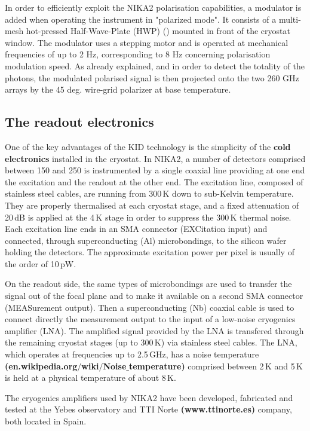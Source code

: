 \documentclass[]{aa} %
\begin{document}
In order to efficiently exploit the NIKA2 polarisation capabilities, a modulator is added when operating the instrument in "polarized mode". It consists of a multi-mesh hot-pressed Half-Wave-Plate (HWP) (\cite{Pisano2016}) mounted in front of the cryostat window. The modulator uses a stepping motor and is operated at mechanical frequencies of up to 2 Hz, corresponding to 8 Hz concerning polarisation modulation speed. As already explained, and in order to detect the totality of the photons, the modulated polarised signal is then projected onto the two 260 GHz arrays by the 45 deg. wire-grid polarizer at base temperature.  


 \subsection{The readout electronics}

One of the key advantages of the KID technology is the simplicity of the {\bf{cold electronics}} installed in the cryostat.
In NIKA2, a number of detectors comprised between 150 and 250 is instrumented by a single coaxial line providing at one end the excitation and the readout at the other end. The excitation line, composed of stainless steel cables, are running from 300\,K down to sub-Kelvin temperature. They are properly thermalised at each cryostat stage, and a fixed attenuation of 20\,dB is applied at the 4\,K stage in order to suppress the 300\,K thermal noise. Each excitation line ends in an SMA connector (EXCitation input) and connected, through superconducting (Al) microbondings, to the silicon wafer holding the detectors. The approximate excitation power per pixel is usually of the order of 10\,pW.

On the readout side, the same types of microbondings are used to transfer the signal out of the focal plane and to make it available on a second SMA connector (MEASurement output). Then a superconducting (Nb) coaxial cable is used to connect directly the measurement output to the input of a low-noise cryogenics amplifier (LNA). The amplified signal provided by the LNA is transfered through the remaining cryostat stages (up to 300\,K) via stainless steel cables. 
The LNA, which operates at frequencies up to 2.5\,GHz, has  a noise temperature \textbf{(en.wikipedia.org$/$wiki$/$Noise$\_$temperature)} comprised between 2\,K and 5\,K is held at a physical temperature of about 8\,K.

The cryogenics amplifiers used by NIKA2 have been developed, fabricated and tested at the Yebes observatory and TTI Norte \textbf{(www.ttinorte.es)} company, both located in Spain. 
\end{document}
